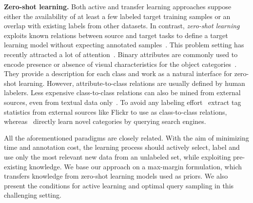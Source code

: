 \documentclass[10pt,twocolumn,letterpaper]{article}
\begin{document}
\textbf{Zero-shot learning.} Both active and transfer learning approaches suppose either the availability of at least a few labeled target training samples or an overlap with existing labels from other datasets. In contrast, \emph{zero-shot learning} exploits known relations between source and target tasks to define a target learning model without expecting annotated samples~\cite{lampert13pami,socher_NIPS2013}. This problem setting has recently attracted a lot of attention~\cite{lampert13pami, akata13cvpr, MensinkCVPR2014, devise, conse, LiECCV2014}.
Binary attributes are commonly used to encode presence or absence of visual characteristics for the object categories~\cite{lampert13pami, akata13cvpr}. They provide a description for each class and work as a natural interface for zero-shot learning. However, attribute-to-class relations are usually defined by human labelers.
Less expensive class-to-class relations can also be mined from external sources, even from textual data only~\cite{devise,conse,rohrbach10cvpr}. To avoid any labeling effort~\cite{MensinkCVPR2014} extract tag statistics from external sources like Flickr to use as class-to-class relations, whereas~\cite{Chen_2013_ICCV} directly learn novel categories by querying search engines.

All the aforementioned paradigms are closely related. With the aim of minimizing time and annotation cost, the learning process should actively select, label and use only the most relevant new data from an unlabeled set, while exploiting pre-existing knowledge. We base our approach on a max-margin formulation, which transfers knowledge from zero-shot learning models used as priors. We also present the conditions for active learning and optimal query sampling in this challenging setting.
\end{document}

